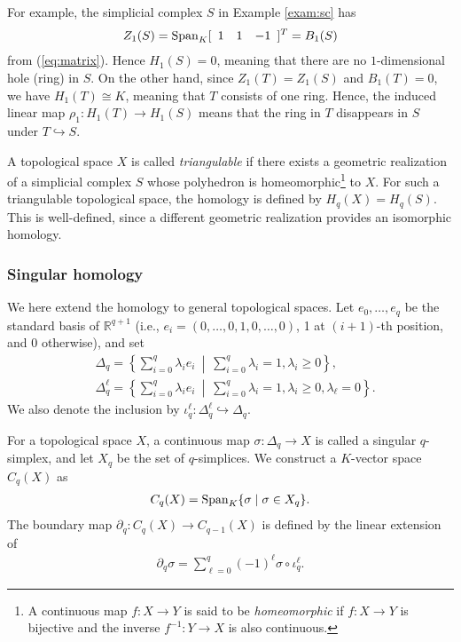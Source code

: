 \documentclass{article}
\newcommand{\ra}{{\rightarrow}}
\newcommand{\lmid}{ \ \middle| \ }
\providecommand{\rl}[1]{\left\{ #1 \right\}}
\begin{document}
For example, the simplicial complex $S$ in Example \ref{exam:sc} has 
\[
Z_1(S)={\rm Span}_K[\begin{array}{ccc}1 & 1 & -1\end{array}]^T=B_1(S)
\]
 from (\ref{eq:matrix}). Hence $H_1(S)=0$, meaning that there are no $1$-dimensional hole (ring) in $S$.
On the other hand, since $Z_1(T)=Z_1(S)$ and $B_1(T)=0$, we have $H_1(T)\cong K$, meaning that $T$ consists of one ring.
Hence, the induced linear map $\rho_1: H_1(T)\rightarrow H_1(S)$ means that the ring in $T$ disappears in $S$ under $T\hookrightarrow S$.

A topological space $X$ is called {\em triangulable} if there exists a geometric realization of a simplicial complex $S$ whose polyhedron is homeomorphic\footnote{A continuous map $f:X \ra Y$ is said to be {\em homeomorphic} if $f:X \ra Y$ is bijective and the inverse $f^{-1}:Y \ra X$ is also continuous.} to $X$.
For such a triangulable topological space, the homology is defined by $H_q(X)=H_q(S)$.
This is well-defined, since a different geometric realization provides an isomorphic homology. 

\subsubsection{Singular homology}\label{sec:singular_homology}
We here extend the homology to general topological spaces.
Let $e_0,\dots,e_q$ be the standard basis of ${\mathbb R}^{q+1}$ (i.e., $e_i=(0,\dots,0,1,0,\dots,0)$, 1 at  $(i+1)$-th position, and 0 otherwise), and set
\begin{align*}
&\Delta_q=\rl{
\sum_{i=0}^q\lambda_ie_i \lmid \sum_{i=0}^q\lambda_i=1, \lambda_i\geq 0
},\\
&\Delta^\ell_q=\rl{
\sum_{i=0}^q\lambda_ie_i \lmid \sum_{i=0}^q\lambda_i=1, \lambda_i\geq 0, \lambda_\ell=0
}.
\end{align*}
We also denote the inclusion by $\iota^\ell_q: \Delta^\ell_q\hookrightarrow \Delta_q$. 

For a topological space $X$, a continuous map $\sigma: \Delta_q\rightarrow X$ is called a singular $q$-simplex, and let $X_q$ be the set of $q$-simplices. 
We construct a $K$-vector space $C_q(X)$ as 
\begin{align*}
C_q(X)={\rm Span}_K\{\sigma\mid\sigma\in X_q\}.
\end{align*}
The boundary map $\partial_q:C_q(X)\rightarrow C_{q-1}(X)$ is defined by the linear extension of
\begin{align*}
\partial_q \sigma=\sum_{\ell=0}^q(-1)^\ell\sigma\circ \iota^\ell_q.
\end{align*}
\end{document}
